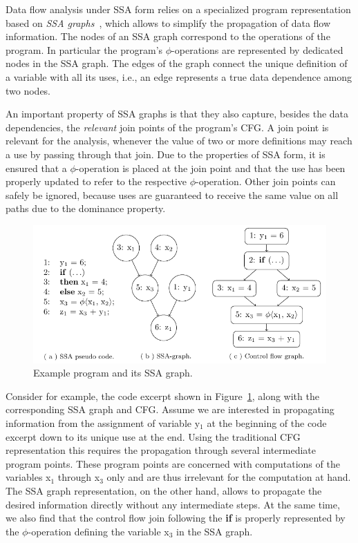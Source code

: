 Data flow analysis under SSA form relies on a specialized program
representation based on \emph{SSA graphs}~\cite{novillo:bib:CFRWZ91}, which
allows to simplify the propagation of data flow information. The nodes of an
SSA graph correspond to the operations of the program. In particular the
program's $\phi$-operations are represented by dedicated nodes in the SSA graph.
The edges of the graph connect the unique definition of a variable with all its
uses, i.e., an edge represents a true data dependence among two nodes.

An important property of SSA graphs is that they also capture, besides the data
dependencies, the \emph{relevant} join points of the program's CFG. A join point
is relevant for the analysis, whenever the value of two or more definitions may
reach a use by passing through that join. Due to the properties of SSA form, it
is ensured that a $\phi$-operation is placed at the join point and that the use
has been properly updated to refer to the respective $\phi$-operation. Other
join points can safely be ignored, because uses are guaranteed to receive the
same value on all paths due to the dominance property.

\begin{figure}[t]
  \begin{center}
    \includegraphics{ssa_graph}
  \end{center}
  \vspace{-2em}
  \caption{Example program and its SSA graph.}
  \label{novillo:fig:ssa_graph}
\end{figure}

Consider for example, the code excerpt shown in
Figure~\ref{novillo:fig:ssa_graph}, along with the corresponding SSA graph and
CFG. Assume we are interested in propagating information from the assignment of
variable y$_1$ at the beginning of the code excerpt down to its unique use at
the end. Using the traditional CFG representation this requires the propagation
through several intermediate program points. These program points are concerned
with computations of the variables x$_1$  through x$_3$ only and are thus
irrelevant for the computation at hand. The SSA graph representation, on the
other hand, allows to propagate the desired information directly without any
intermediate steps. At the same time, we also find that the control flow join
following the \textbf{if} is properly represented by the $\phi$-operation
defining the variable x$_3$ in the SSA graph.

